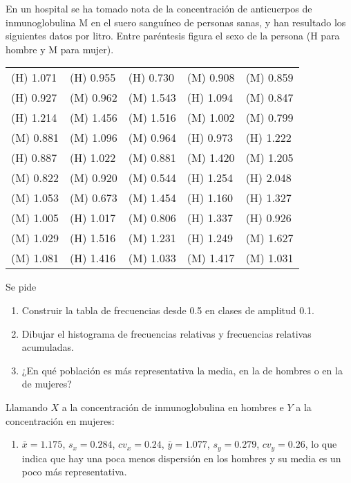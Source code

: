 {En un hospital se ha tomado nota de la concentración de anticuerpos de inmunoglobulina M en el suero sanguíneo de personas sanas, y han resultado los siguientes datos por litro.
Entre paréntesis figura el sexo de la persona (H para hombre y M para mujer).
\begin{center}
\begin{tabular}{lllll}
(H) 1.071 & (H) 0.955 & (H) 0.730 & (M) 0.908 & (M) 0.859  \\
(H) 0.927 & (M) 0.962 & (M) 1.543 & (H) 1.094 & (M) 0.847  \\
(H) 1.214 & (M) 1.456 & (M) 1.516 & (M) 1.002 & (M) 0.799  \\
(M) 0.881 & (M) 1.096 & (M) 0.964 & (H) 0.973 & (H) 1.222  \\
(H) 0.887 & (H) 1.022 & (M) 0.881 & (M) 1.420 & (M) 1.205  \\
(M) 0.822 & (M) 0.920 & (M) 0.544 & (H) 1.254 & (H) 2.048  \\
(M) 1.053 & (M) 0.673 & (M) 1.454 & (H) 1.160 & (H) 1.327  \\
(M) 1.005 & (H) 1.017 & (M) 0.806 & (H) 1.337 & (H) 0.926  \\
(M) 1.029 & (H) 1.516 & (M) 1.231 & (H) 1.249 & (M) 1.627  \\
(M) 1.081 & (H) 1.416 & (M) 1.033 & (M) 1.417 & (M) 1.031  \\
\end{tabular}
\end{center}
Se pide
\begin{enumerate}
\item Construir la tabla de frecuencias desde 0.5 en clases de amplitud 0.1.
\item Dibujar el histograma de frecuencias relativas y frecuencias relativas acumuladas.
\item ¿En qué población es más representativa la media, en la de hombres o en la de mujeres?
\end{enumerate}
}
{Llamando $X$ a la concentración de inmunoglobulina en hombres e $Y$ a la concentración en mujeres:
\begin{enumerate}[start=3]
\item $\bar x = 1.175$, $s_x = 0.284$, $cv_x=0.24$, $\bar y=1.077$, $s_y=0.279$, $cv_y=0.26$, lo que indica que hay una poca menos dispersión en los hombres y su media es un poco más representativa.
\end{enumerate}
}
{}


